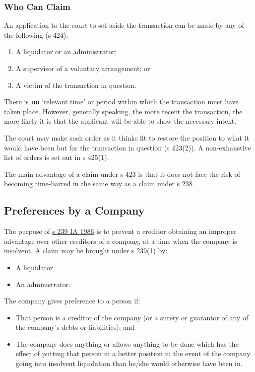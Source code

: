 \documentclass[
]{article}
\providecommand{\tightlist}{%
  \setlength{\itemsep}{0pt}\setlength{\parskip}{0pt}}
\begin{document}
\hypertarget{who-can-claim}{%
\subsubsection{Who Can Claim}\label{who-can-claim}}

An application to the court to set aside the transaction can be made by
any of the following (s 424):

\begin{enumerate}
\tightlist
\item
  A liquidator or an administrator;
\item
  A supervisor of a voluntary arrangement; or
\item
  A victim of the transaction in question.
\end{enumerate}

There is \textbf{no} `relevant time' or period within which the
transaction must have taken place. However, generally speaking, the more
recent the transaction, the more likely it is that the applicant will be
able to show the necessary intent.

The court may make such order as it thinks fit to restore the position
to what it would have been but for the transaction in question (s
423(2)). A non-exhaustive list of orders is set out in s 425(1).

The main advantage of a claim under s 423 is that it does not face the
risk of becoming time-barred in the same way as a claim under s 238.

\hypertarget{preferences-by-a-company}{%
\subsection{Preferences by a Company}\label{preferences-by-a-company}}

The purpose of
\href{https://www.legislation.gov.uk/ukpga/1986/45/section/239}{s 239 IA
1986} is to prevent a creditor obtaining an improper advantage over
other creditors of a company, at a time when the company is insolvent. A
claim may be brought under s 239(1) by:

\begin{itemize}
\tightlist
\item
  A liquidator
\item
  An administrator.
\end{itemize}

The company gives preference to a person if:

\begin{itemize}
\tightlist
\item
  That person is a creditor of the company (or a surety or guarantor of
  any of the company's debts or liabilities); and
\item
  The company does anything or allows anything to be done which has the
  effect of putting that person in a better position in the event of the
  company going into insolvent liquidation than he/she would otherwise
  have been in.
\end{itemize}
\end{document}
